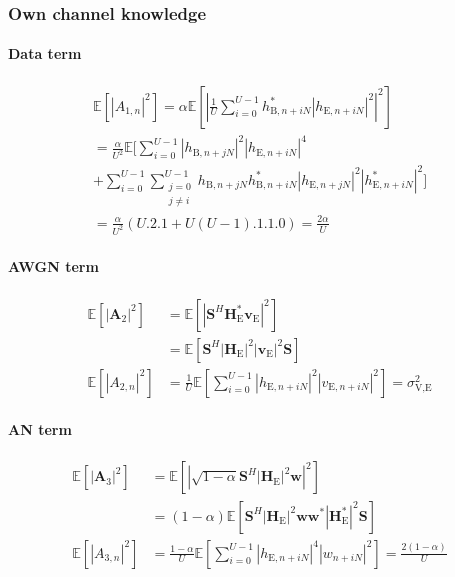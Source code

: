 \documentclass[journal,comsoc]{IEEEtran}
\newcommand{\module}[1]{\left|#1\right|}
\newcommand{\EX}[1]{\mathbb{E} \left[#1\right]}%
\newcommand{\HE}{\textbf{H}_{\text{E}}}
\newcommand{\ve}{\textbf{v}_{\text{E}}}
\newcommand{\spread}{\textbf{S}}
\newcommand{\w}{\textbf{w}}
\begin{document}
\subsubsection{Own channel knowledge}\label{sec:own-channel-knowledge-app}
\paragraph{Data term}\label{sec:data-term-app-3}
\begin{multline}
	\EX{|A_{1,n}|^2} = \alpha \EX{\left|\frac{1}{U}\sum_{i=0}^{U-1} h_{\text{B}, n + iN}^* \left| h_{\text{E}, n + iN}\right|^2\right|^2} \\
	=\frac{\alpha}{U^2} \mathbb{E}\Bigg[ \sum_{i=0}^{U-1} \left| h_{\text{B}, n + jN}\right|^2 \left| h_{\text{E}, n + iN}\right|^4 \\
	+ \sum_{i=0}^{U-1}\sum_{\substack{j=0 \\ j\neq i}}^{U-1}  h_{\text{B}, n + jN} h^*_{\text{B}, n + iN} \left| h_{\text{E}, n + jN}\right|^2 \left| h^*_{\text{E}, n + iN}\right|^2 \Bigg] \\
	= \frac{\alpha}{U^2} \left(U.2.1 + U(U-1).1.1.0\right) = \frac{2\alpha}{U}
	\label{eq:data_eve_filt5-app}
\end{multline}


\paragraph{AWGN term}\label{sec:awgn-term-app-3}
\begin{equation}
	\begin{split}
		\EX{|\textbf{A}_{2}|^2} &=  \EX{\module{\spread^H \HE^* \ve}^2} \\
		&=\EX{\spread^H   \left|\HE\right|^2  \left|\ve\right|^2 \spread } \\
		\EX{|A_{2,n}|^2} &= \frac{1}{U} \EX{\sum_{i=0}^{U-1} |h_{\text{E}, n + iN}|^2 |v_{\text{E}, n + iN}|^2} = \sigma^2_{\text{V,E}}
	\end{split}
	\label{eq:noise_eve_filt5-app}
\end{equation}

\paragraph{AN term}\label{sec:an-term-app-3}
\begin{equation}
	\begin{split}
		\EX{|\textbf{A}_{3}|^2} &=  \EX{\module{\sqrt{1-\alpha}\spread^H \left|\HE\right|^2 \w}^2} \\
		&=(1-\alpha)\EX{\spread^H \left|\HE\right|^2 \w\w^* \left|\HE^*\right|^2\spread } \\
		\EX{|A_{3,n}|^2}  &= \frac{1-\alpha}{U} \EX{\sum_{i=0}^{U-1} |h_{\text{E}, n + iN}|^4 |w_{n + iN}|^2} = \frac{2(1-\alpha)}{U}
	\end{split}
	\label{eq:an_eve_filt5-app}
\end{equation}
\end{document}
